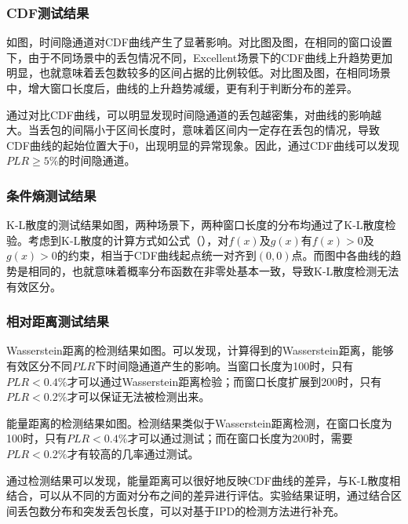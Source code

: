 \subsubsection{CDF测试结果}
\label{chap:analyze:result:window:cdf}

如图，时间隐通道对CDF曲线产生了显著影响。对比图及图，在相同的窗口设置下，由于不同场景中的丢包情况不同，Excellent场景下的CDF曲线上升趋势更加明显，也就意味着丢包数较多的区间占据的比例较低。对比图及图，在相同场景中，增大窗口长度后，曲线的上升趋势减缓，更有利于判断分布的差异。

通过对比CDF曲线，可以明显发现时间隐通道的丢包越密集，对曲线的影响越大。当丢包的间隔小于区间长度时，意味着区间内一定存在丢包的情况，导致CDF曲线的起始位置大于0，出现明显的异常现象。因此，通过CDF曲线可以发现$PLR\ge5\%$的时间隐通道。

\subsubsection{条件熵测试结果}
\label{chap:analyze:result:window:kld}

K-L散度的测试结果如图，两种场景下，两种窗口长度的分布均通过了K-L散度检验。考虑到K-L散度的计算方式如公式（），对$f(x)$及$g(x)$有$f(x)>0$及$g(x)>0$的约束，相当于CDF曲线起点统一对齐到$(0,0)$点。而图中各曲线的趋势是相同的，也就意味着概率分布函数在非零处基本一致，导致K-L散度检测无法有效区分。

\subsubsection{相对距离测试结果}
\label{chap:analyze:result:window:distance}

Wasserstein距离的检测结果如图。可以发现，计算得到的Wasserstein距离，能够有效区分不同$PLR$下时间隐通道产生的影响。当窗口长度为100时，只有$PLR<0.4\%$才可以通过Wasserstein距离检验；而窗口长度扩展到200时，只有$PLR<0.2\%$才可以保证无法被检测出来。

能量距离的检测结果如图。检测结果类似于Wasserstein距离检测，在窗口长度为100时，只有$PLR<0.4\%$才可以通过测试；而在窗口长度为200时，需要$PLR<0.2\%$才有较高的几率通过测试。

通过检测结果可以发现，能量距离可以很好地反映CDF曲线的差异，与K-L散度相结合，可以从不同的方面对分布之间的差异进行评估。实验结果证明，通过结合区间丢包数分布和突发丢包长度，可以对基于IPD的检测方法进行补充。


